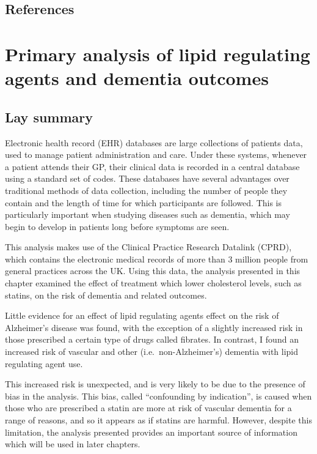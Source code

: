 \documentclass[a4paper, twoside]{templates/ociamthesis}
\begin{document}
\newpage

\hypertarget{references-2}{%
\section{References}\label{references-2}}



\hypertarget{cprd-analysis-heading}{%
\chapter{Primary analysis of lipid regulating agents and dementia outcomes}\label{cprd-analysis-heading}}

\minitoc 

\hypertarget{lay-summary-3}{%
\section{Lay summary}\label{lay-summary-3}}

Electronic health record (EHR) databases are large collections of patients data, used to manage patient administration and care. Under these systems, whenever a patient attends their GP, their clinical data is recorded in a central database using a standard set of codes. These databases have several advantages over traditional methods of data collection, including the number of people they contain and the length of time for which participants are followed. This is particularly important when studying diseases such as dementia, which may begin to develop in patients long before symptoms are seen.

This analysis makes use of the Clinical Practice Research Datalink (CPRD), which contains the electronic medical records of more than 3 million people from general practices across the UK. Using this data, the analysis presented in this chapter examined the effect of treatment which lower cholesterol levels, such as statins, on the risk of dementia and related outcomes.

Little evidence for an effect of lipid regulating agents effect on the risk of Alzheimer's disease was found, with the exception of a slightly increased risk in those prescribed a certain type of drugs called fibrates. In contrast, I found an increased risk of vascular and other (i.e.~non-Alzheimer's) dementia with lipid regulating agent use.

This increased risk is unexpected, and is very likely to be due to the presence of bias in the analysis. This bias, called ``confounding by indication'', is caused when those who are prescribed a statin are more at risk of vascular dementia for a range of reasons, and so it appears as if statins are harmful. However, despite this limitation, the analysis presented provides an important source of information which will be used in later chapters.
\end{document}
